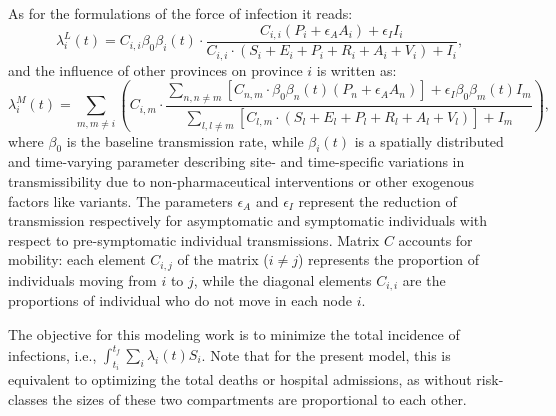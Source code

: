 As for the formulations of the force of infection it reads:
\begin{equation} 
     \lambda^L_i(t) = C_{i,i} \beta_{0}  \beta_i(t) \cdot \frac{C_{i,i}  (P_i + \epsilon_A  A_i) + \epsilon_I  I_i}{C_{i,i} \cdot (S_i + E_i + P_i + R_i + A_i + V_i) + I_i}, \label{eq:foiL}
\end{equation}
and the influence of other provinces on province $i$ is written as:
\begin{equation}
     \lambda^M_i(t) = \sum_{m, m \neq i} \left( 
     C_{i,m} \cdot 
     \frac{
     \sum_{n, n \neq m} \left[ C_{n,m} \cdot \beta_{0}  \beta_n(t)  (P_n + \epsilon_A  A_n) \right] + \epsilon_I  \beta_{0}  \beta_m(t)  I_m
     }
     {
     \sum_{l, l \neq m}  \left[C_{l, m} \cdot (S_l + E_l + P_l + R_l + A_l + V_l) \right] + I_m
     } 
     \right), \label{eq:foiM}
\end{equation}
where $\beta_{0}$ is the baseline transmission rate, while $\beta_{i}(t)$ is a spatially distributed and time-varying parameter describing site- and time-specific variations in transmissibility due to non-pharmaceutical interventions or other exogenous factors like variants. The parameters $\epsilon_A$ and $\epsilon_I$ represent the reduction of transmission respectively for asymptomatic and symptomatic individuals with respect to pre-symptomatic individual transmissions. Matrix $C$ accounts for mobility: each element $C_{i,j}$ of the matrix ($i \neq j$) represents the proportion of individuals moving from $i$ to $j$, while the diagonal elements $C_{i,i}$ are the proportions of individual who do not move in each node $i$.

The objective for this modeling work is to minimize the total incidence of infections, i.e., $\int_{t_i}^{t_f} \sum_i \lambda_i(t) S_i$. Note that for the present model, this is equivalent to optimizing the total deaths or hospital admissions, as without risk-classes the sizes of these two compartments are proportional to each other.


